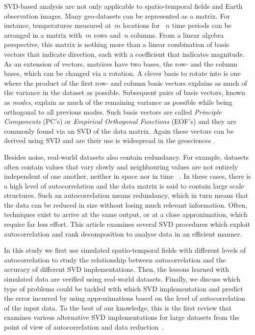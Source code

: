 \documentclass[ijgi,article,submit,moreauthors,pdftex,10pt,a4paper]{Definitions/mdpi}
\begin{document}
SVD-based analysis are not only applicable to spatio-temporal fields and Earth observation images. Many geo-datasets can be represented as a matrix.
For instance, temperatures measured at~$m$ locations for ~$n$ time periods can be arranged in a matrix with~$m$ rows and~$n$ columns. From a linear
algebra perspective, this matrix is nothing more than a linear combination of basis vectors that indicate direction, each with a coefficient that
indicates magnitude. As an extension of vectors, matrices have two bases, the row- and the column bases, which can be changed via a rotation. A clever
basis to rotate into is one where the product of the first row- and column basis vectors explains as much of the variance in the dataset as possible.
Subsequent pairs of basis vectors, known as \textit{modes}, explain as much of the remaining variance as possible while being orthogonal to all
previous modes. Such basis vectors are called \textit{Principle Components} (PC's) or \textit{Empirical Orthogonal Functions} (EOF's) and they are
commonly found via an SVD of the data matrix. Again these vectors can be derived using SVD and are their use is widespread in the geosciences
\cite{demirel10,hannachi07}. 

Besides noise, real-world datasets also contain redundancy. For example, datasets often contain values that vary slowly and neighbouring values are
not entirely independent of one another, neither in space nor in time ~\cite{Eshel2011}. In these cases, there is a high level of autocorrelation and
the data matrix is said to contain large scale structures. Such an autocorrelation means redundancy, which in turn means that the data can be reduced
in size without losing much relevant information. Often, techniques exist to arrive at the same output, or at a close approximation, which require far
less effort. This article examines several SVD procedures which exploit autocorrelation and rank decomposition to analyse data in an efficient manner. 

In this study we first use simulated spatio-temporal fields with different levels of autocorrelation to study the relationship between autocorrelation
and the accuracy of different SVD implementations. Then, the lessons learned with simulated data are verified using real-world datasets. Finally, we
discuss which type of problems could be tackled with which SVD implementation and predict the error incurred by using approximations based on the
level of autocorrelation of the input data. To the best of our knowledge, this is the first review that examines various alternative SVD
implementations for large datasets from the point of view of autocorrelation and data reduction~\cite{Golub1970, Bjorck1973, Chan1982}.
 
\end{document}
